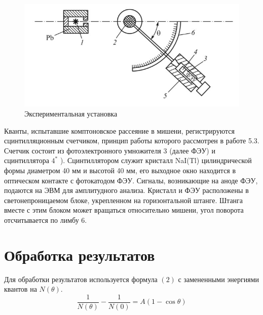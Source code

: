 \documentclass[a4paper, 12pt]{article}%
\begin{document}
\begin{figure}[h]
\begin{center}
\includegraphics[width = \textwidth]{16.jpg}
\caption{Экспериментальная установка}
\end{center}
\end{figure}

Кванты, испытавшие комптоновское рассеяние в мишени, регистрируются сцинтилляционным счетчиком, принцип работы которого рассмотрен в работе 5.3. Счетчик состоит из фотоэлектронного умножителя 3 (далее ФЭУ) и сцинтиллятора $4^{*}$ ). Сцинтиллятором служит кристалл NaI(Tl) цилиндрической формы диаметром 40 мм и высотой 40 мм, его выходное окно находится в оптическом контакте с фотокатодом ФЭУ. Сигналы, возникающие на аноде ФЭУ, подаются на ЭВМ для амплитудного анализа. Кристалл и ФЭУ расположены в светонепроницаемом блоке, укрепленном на горизонтальной штанге. Штанга вместе с этим блоком может вращаться относительно мишени, угол поворота отсчитывается по лимбу $6 .$


\section{Обработка результатов}

Для обработки результатов используется формула $(2)$ с замененными энергиями квантов на $N(\theta)$.
\begin{equation}
\frac{1}{N(\theta)} - \frac{1}{N(0)} = A(1-\cos\theta)
\end{equation}
\newpage
\end{document}
